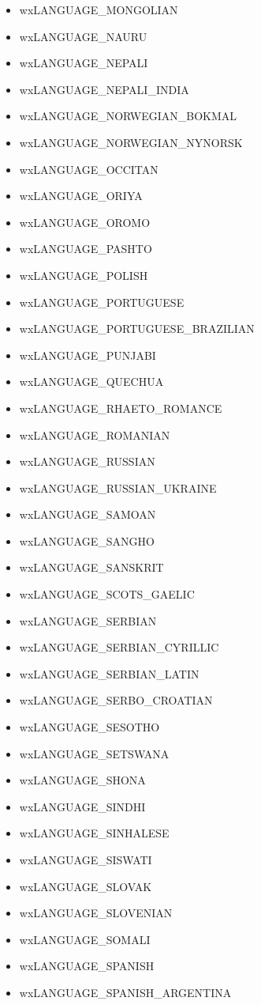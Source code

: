 \begin{itemize}
\item wxLANGUAGE\_MONGOLIAN
\item wxLANGUAGE\_NAURU
\item wxLANGUAGE\_NEPALI
\item wxLANGUAGE\_NEPALI\_INDIA
\item wxLANGUAGE\_NORWEGIAN\_BOKMAL
\item wxLANGUAGE\_NORWEGIAN\_NYNORSK
\item wxLANGUAGE\_OCCITAN
\item wxLANGUAGE\_ORIYA
\item wxLANGUAGE\_OROMO
\item wxLANGUAGE\_PASHTO
\item wxLANGUAGE\_POLISH
\item wxLANGUAGE\_PORTUGUESE
\item wxLANGUAGE\_PORTUGUESE\_BRAZILIAN
\item wxLANGUAGE\_PUNJABI
\item wxLANGUAGE\_QUECHUA
\item wxLANGUAGE\_RHAETO\_ROMANCE
\item wxLANGUAGE\_ROMANIAN
\item wxLANGUAGE\_RUSSIAN
\item wxLANGUAGE\_RUSSIAN\_UKRAINE
\item wxLANGUAGE\_SAMOAN
\item wxLANGUAGE\_SANGHO
\item wxLANGUAGE\_SANSKRIT
\item wxLANGUAGE\_SCOTS\_GAELIC
\item wxLANGUAGE\_SERBIAN
\item wxLANGUAGE\_SERBIAN\_CYRILLIC
\item wxLANGUAGE\_SERBIAN\_LATIN
\item wxLANGUAGE\_SERBO\_CROATIAN
\item wxLANGUAGE\_SESOTHO
\item wxLANGUAGE\_SETSWANA
\item wxLANGUAGE\_SHONA
\item wxLANGUAGE\_SINDHI
\item wxLANGUAGE\_SINHALESE
\item wxLANGUAGE\_SISWATI
\item wxLANGUAGE\_SLOVAK
\item wxLANGUAGE\_SLOVENIAN
\item wxLANGUAGE\_SOMALI
\item wxLANGUAGE\_SPANISH
\item wxLANGUAGE\_SPANISH\_ARGENTINA

\end{itemize}
